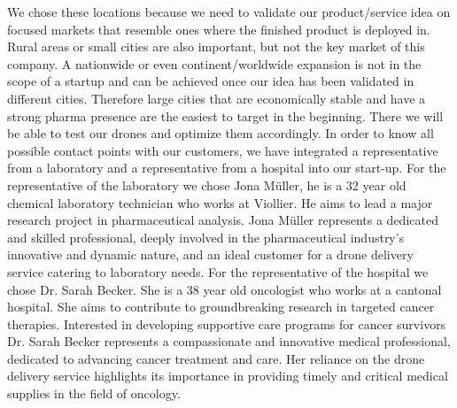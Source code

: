 We chose these locations because we need to validate our product/service idea on focused markets that resemble ones where the finished product is deployed in. Rural areas or small cities are also important, but not the key market of this company. A nationwide or even continent/worldwide expansion is not in the scope of a startup and can be achieved once our idea has been validated in different cities. Therefore large cities that are economically stable and have a strong pharma presence are the easiest to target in the beginning. There we will be able to test our drones and optimize them accordingly.
\newline
\newline
In order to know all possible contact points with our customers, we have integrated a representative from a laboratory and a representative from a hospital into our start-up.
\newline
\newline
For the representative of the laboratory we chose Jona Müller, he is a 32 year old chemical laboratory technician who works at Viollier. He aims to lead a major research project in pharmaceutical analysis. Jona Müller represents a dedicated and skilled professional, deeply involved in the pharmaceutical industry's innovative and dynamic nature, and an ideal customer for a drone delivery service catering to laboratory needs.
\newline
\newline
For the representative of the hospital we chose Dr. Sarah Becker. She is a 38 year old oncologist who works at a cantonal hospital. She aims to contribute to groundbreaking research in targeted cancer therapies. Interested in developing supportive care programs for cancer survivors Dr. Sarah Becker represents a compassionate and innovative medical professional, dedicated to advancing cancer treatment and care. Her reliance on the drone delivery service highlights its importance in providing timely and critical medical supplies in the field of oncology.
